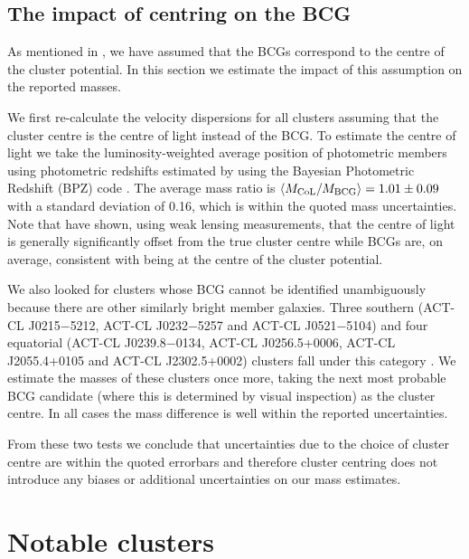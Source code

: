 \subsection{The impact of centring on the BCG}
\label{s:miscentring}

As mentioned in , we have assumed that the BCGs correspond to the centre of the 
cluster potential. In this section we estimate the impact of this assumption on the reported 
masses.

We first re-calculate the velocity dispersions for all clusters assuming that the cluster centre 
is the centre of light instead of the BCG. To estimate the centre of light we take the 
luminosity-weighted average position of photometric members using photometric redshifts estimated 
by \cite{menanteau13} using the Bayesian Photometric Redshift (BPZ) code \citep{benitez00}. The 
average mass ratio is $\langle M_{\rm CoL}/M_{\rm BCG} \rangle = 1.01\pm0.09$ with a standard 
deviation of 0.16, which is within the quoted mass uncertainties. Note that \cite{viola15} have 
shown, using weak lensing measurements, that the centre of light is generally significantly offset 
from the true cluster centre while BCGs are, on average, consistent with being at the centre of 
the cluster potential.

We also looked for clusters whose BCG cannot be identified unambiguously because there are other similarly bright member galaxies. Three southern (ACT-CL J0215$-$5212, ACT-CL J0232$-$5257 and ACT-CL J0521$-$5104) and four equatorial (ACT-CL J0239.8$-$0134, ACT-CL J0256.5+0006, ACT-CL J2055.4+0105 and ACT-CL J2302.5+0002) clusters fall under this category \citep[see][for optical images of ACT clusters;  for more detailed comments on some of these clusters]{menanteau10_act,menanteau13}. We estimate the masses of these clusters once more, taking the next most probable BCG candidate (where this is determined by visual inspection) as the cluster centre. In all cases the mass difference is well within the reported uncertainties.

From these two tests we conclude that uncertainties due to the choice of cluster centre are within the quoted errorbars and therefore cluster centring does not introduce any biases or additional uncertainties on our mass estimates.


\section{Notable clusters}
\label{s:individual}

